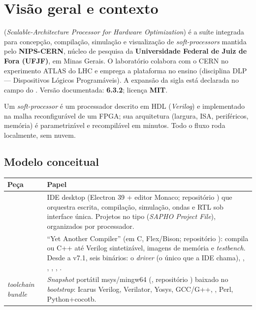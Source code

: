 \section{Visão geral e contexto}
\label{sec:S01-visao-geral}

 (\emph{Scalable-Architecture Processor for Hardware Optimization}) é a suíte
integrada para concepção, compilação, simulação e visualização de
\emph{soft-processors} mantida pelo \textbf{NIPS-CERN}, núcleo de pesquisa da
\textbf{Universidade Federal de Juiz de Fora (UFJF)}, em Minas Gerais. O
laboratório colabora com o CERN no experimento ATLAS do LHC e emprega a
plataforma no ensino (disciplina DLP --- Dispositivos Lógicos Programáveis). A
expansão da sigla está declarada no campo  do
. Versão documentada: \textbf{6.3.2}; licença \textbf{MIT}.

Um \emph{soft-processor} é um processador descrito em HDL (\emph{Verilog}) e
implementado na malha reconfigurável de um FPGA; sua arquitetura (largura, ISA,
periféricos, memória) é parametrizável e recompilável em minutos. Todo o fluxo
 roda localmente, sem nuvem.

\subsection{Modelo conceitual}

\begin{tabularx}{\linewidth}{l Y}
\toprule
\textbf{Peça} & \textbf{Papel} \\
\midrule
{} & IDE desktop (Electron 39 + editor Monaco; repositório ) que orquestra escrita, compilação, simulação, ondas e RTL sob interface única. Projetos no tipo  (\emph{SAPHO Project File}), organizados por processador. \\
 & \enquote{Yet Another Compiler} (em C, Flex/Bison; repositório ): compila \cmm{} ou C++ até Verilog sintetizável, imagens de memória e \emph{testbench}. Desde a v7.1, seis binários: o \emph{driver}  (o único que a IDE chama), , , , , . \\
\emph{toolchain bundle} & \emph{Snapshot} portátil msys/mingw64 (, repositório ) baixado no \emph{bootstrap}: Icarus Verilog, Verilator, Yosys, GCC/G++, , Perl, Python+cocotb. \\
\bottomrule
\end{tabularx}

